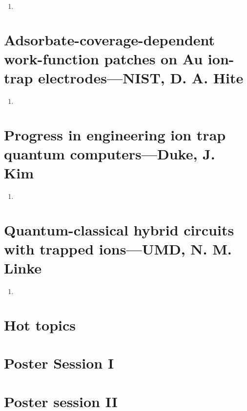 \begin{enumerate}
    \item
\end{enumerate}



\section{Adsorbate-coverage-dependent work-function patches on Au ion-trap electrodes---NIST, D. A. Hite} %
\label{sec:adsorbate_coverage_dependent_work_function_patches_on_au_ion_trap_electrodes_nist_d_a_hite}



\begin{enumerate}
    \item
\end{enumerate}



\section{Progress in engineering ion trap quantum computers---Duke, J. Kim} %
\label{sec:progress_in_engineering_ion_trap_quantum_computers_duke_j_kim}

\begin{enumerate}
    \item
\end{enumerate}


\section{Quantum-classical hybrid circuits with trapped ions---UMD, N. M. Linke} %
\label{sec:quantum_classical_hybrid_circuits_with_trapped_ions_umd_n_m_linke}

\begin{enumerate}
    \item
\end{enumerate}


\section{Hot topics} %
\label{sec:hot_topics}




\section{Poster Session I} %
\label{sec:poster_session_i}



\section{Poster session II} %
\label{sec:poster_session_ii}


